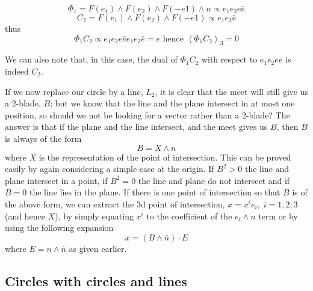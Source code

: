 \[
\Phi_1 = F(e_1) \wedge F(e_2) \wedge F(-e1) \wedge n \propto e_1e_2e\bar{e}
\]
\[
C_2 = F(e_1) \wedge F(e_2) \wedge F(-e1) \propto e_1e_2\bar{e}
\]
thus
\[
\Phi_1C_2 \propto e_1e_2e\bar{e}e_1e_2\bar{e} = e \mbox{ hence }
\left<\Phi_1C_2\right>_3 = 0
\]

We can also note that, in this case, the dual of $\Phi_1C_2$ with respect to
$e_1e_2e\bar{e}$ is indeed $C_2$.

If we now replace our circle by a line, $L_2$, it is
clear that the meet will still give us a 2-blade, $B$;
but we know that the line and the plane intersect in at
most one position, so should we not be looking for a
vector rather than a 2-blade? The answer is that if the
plane and the line intersect, and the meet gives us $B$,
then $B$ is always of the form
%
\[  B = X\wedge n  \]
%
where $X$ is the representation of the point of intersection. This can be
proved easily by again considering a simple case at the
origin. If $B^2>0$ the line and plane intersect in a
point, if $B^2=0$ the line and plane do not intersect and
if $B=0$ the line lies in the plane. If there is one
point of intersection so that $B$ is of the above form,
we can extract the 3d point of intersection,
$x=x^ie_i,\;i=1,2,3$ (and hence $X$), by simply equating
$x^i$ to the coefficient of the $e_i\wedge n$ term or by
using the following expansion
%
\begin{equation}
 x = (B\wedge \bar{n})\cdot E
 \end{equation}
%
where $E=n\wedge \bar{n}$ as given earlier.


\subsection{Circles with circles and lines }

